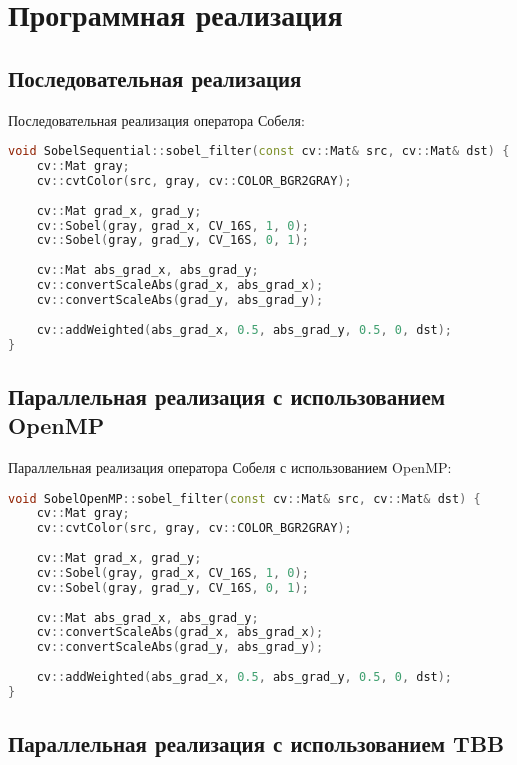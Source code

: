 \documentclass[]{article}
\theoremstyle{remark}
\theoremstyle{definition}
\begin{document}
\newpage

\section{Программная реализация}

\subsection{Последовательная реализация}

\par Последовательная реализация оператора Собеля:

\begin{lstlisting}[language=C++]
void SobelSequential::sobel_filter(const cv::Mat& src, cv::Mat& dst) {
    cv::Mat gray;
    cv::cvtColor(src, gray, cv::COLOR_BGR2GRAY);
    
    cv::Mat grad_x, grad_y;
    cv::Sobel(gray, grad_x, CV_16S, 1, 0);
    cv::Sobel(gray, grad_y, CV_16S, 0, 1);
    
    cv::Mat abs_grad_x, abs_grad_y;
    cv::convertScaleAbs(grad_x, abs_grad_x);
    cv::convertScaleAbs(grad_y, abs_grad_y);
    
    cv::addWeighted(abs_grad_x, 0.5, abs_grad_y, 0.5, 0, dst);
}
\end{lstlisting}

\subsection{Параллельная реализация с использованием OpenMP}

\par Параллельная реализация оператора Собеля с использованием OpenMP:

\begin{lstlisting}[language=C++]
void SobelOpenMP::sobel_filter(const cv::Mat& src, cv::Mat& dst) {
    cv::Mat gray;
    cv::cvtColor(src, gray, cv::COLOR_BGR2GRAY);
    
    cv::Mat grad_x, grad_y;
    cv::Sobel(gray, grad_x, CV_16S, 1, 0);
    cv::Sobel(gray, grad_y, CV_16S, 0, 1);
    
    cv::Mat abs_grad_x, abs_grad_y;
    cv::convertScaleAbs(grad_x, abs_grad_x);
    cv::convertScaleAbs(grad_y, abs_grad_y);
    
    cv::addWeighted(abs_grad_x, 0.5, abs_grad_y, 0.5, 0, dst);
}
\end{lstlisting}

\subsection{Параллельная реализация с использованием TBB}
\end{document}
